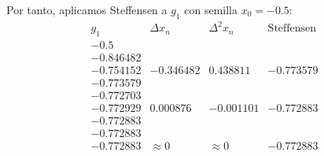 \begin{ejercicio}
\begin{enumerate}
        Por tanto, aplicamos Steffensen a $g_1$ con semilla $x_0=-0.5$:
        \begin{equation*}
            \begin{array}{c|c|c|c}
                g_1 & \Delta x_n & \Delta^2 x_n & \text{Steffensen}\\ \hline
                -0.5 &&\\
                -0.846482&&\\
                -0.754152 & -0.346482 & 0.438811 & -0.773579\\
                -0.773579&&\\
                -0.772703&&\\
                -0.772929 & 0.000876 & -0.001101 & -0.772883\\
                -0.772883&&\\
                -0.772883&&\\
                -0.772883 & \approx 0 & \approx 0 & -0.772883                
            \end{array}
        \end{equation*}
    \end{enumerate}
\end{ejercicio}


